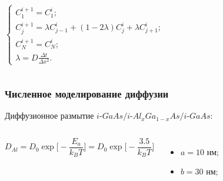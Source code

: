 \documentclass[10pt,pdf,hyperref={unicode},aspectratio={169}]{beamer}
\begin{document}
\begin{frame}
\begin{columns}
		\small
		\begin{equation*}
		\begin{cases}
			C^{i+1}_{1} = C^{i}_{1};\\
			C^{i+1}_{j} = \lambda C^{i}_{j-1} + (1 - 2\lambda)C^{i}_{j} + \lambda C^{i}_{j+1};\\
			C^{i+1}_{N} = C^{i}_{N};\\
			\lambda = D\frac{\Delta t}{\Delta x^{2}}.
		\end{cases}
		\end{equation*}
	\end{columns}
\end{frame}

\begin{frame}
	\frametitle{Численное моделирование диффузии}
Диффузионное размытие {\color{blue} $i$-$GaAs/i$-$Al_{x}Ga_{1-x}As/i$-$GaAs$}:
	\begin{columns}
		\begin{equation*}
			\label{eq:DNd}
			D_{Al} = D_{0}\exp\bigg[-\frac{E_{a}}{k_{B}T}\bigg] = D_{0}\exp\bigg[-\frac{3.5}{k_{B}T}\bigg]
		\end{equation*}
		\begin{itemize}
			\item $a = 10$ нм;
			\item $b = 30$ нм;
		\end{itemize}
	\end{columns}


\end{frame}
\end{document}
